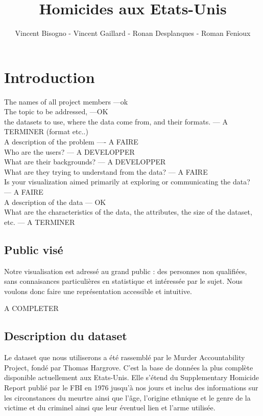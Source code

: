 \documentclass[a4paper,10pt]{report}
\title{Homicides aux Etats-Unis}
\author{Vincent Bisogno - Vincent Gaillard - Ronan Desplanques - Roman Fenioux}
\begin{document}
\maketitle



\section{Introduction}


    The names of all project members ---ok\\
    The topic to be addressed, ---OK\\
    the datasets to use, where the data come from, and their formats. --- A TERMINER (format etc..)\\
    A description of the problem ---- A FAIRE\\
        Who are the users? --- A DEVELOPPER\\
        What are their backgrounds? --- A DEVELOPPER\\
        What are they trying to understand from the data? --- A FAIRE\\
        Is your visualization aimed primarily at exploring or communicating the data? \\ --- A FAIRE\\
    A description of the data --- OK\\
        What are the characteristics of the data, the attributes, the size of the dataset, etc. --- A TERMINER\\


\subsection{Public visé}
Notre visualisation est adressé au grand public : des personnes non qualifiées, sans connaisances particulières en statistique et intéressée
par le sujet. Nous voulons donc faire une représentation accessible et intuitive.

A COMPLETER


\subsection{Description du dataset}
Le dataset que nous utiliserons a été rassemblé par le Murder Accountability Project, fondé par Thomas Hargrove. C'est la base de données
la plus complète disponible actuellement aux Etats-Unis. Elle s'étend du Supplementary Homicide Report publié par le FBI en 1976 jusqu'à nos jours
et inclus des informations sur les circonstances du meurtre ainsi que l'âge, l'origine ethnique et le genre de la victime et du criminel ainsi que
leur éventuel lien et l'arme utilisée.
\end{document}
